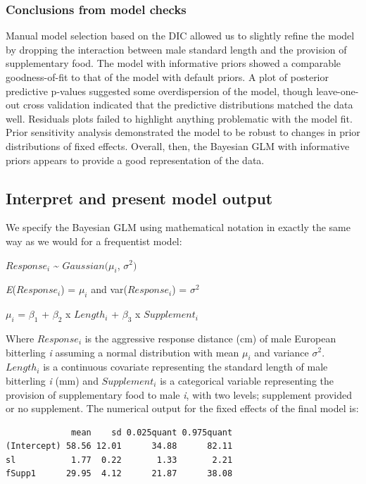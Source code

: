 \documentclass[
]{book}
\begin{document}
\hypertarget{conclusions-from-model-checks}{%
\subsubsection{Conclusions from model checks}\label{conclusions-from-model-checks}}

Manual model selection based on the DIC allowed us to slightly refine the model by dropping the interaction between male standard length and the provision of supplementary food. The model with informative priors showed a comparable goodness-of-fit to that of the model with default priors. A plot of posterior predictive p-values suggested some overdispersion of the model, though leave-one-out cross validation indicated that the predictive distributions matched the data well. Residuals plots failed to highlight anything problematic with the model fit. Prior sensitivity analysis demonstrated the model to be robust to changes in prior distributions of fixed effects. Overall, then, the Bayesian GLM with informative priors appears to provide a good representation of the data.

\hypertarget{interpret-and-present-model-output}{%
\subsection{Interpret and present model output}\label{interpret-and-present-model-output}}

We specify the Bayesian GLM using mathematical notation in exactly the same way as we would for a frequentist model:

\(Response_{i}\) \textasciitilde{} \(Gaussian(\mu_{i}\), \(\sigma^{2})\)

\emph{E}(\(Response_i\)) = \(\mu_i\) and var(\(Response_{i}\)) = \(\sigma^{2}\)

\(\mu_{i}\) = \(\beta_1\) + \(\beta_2\) x \(Length_{i}\) + \(\beta_3\) x \(Supplement_{i}\)

Where \(Response_{i}\) is the aggressive response distance (cm) of male European bitterling \emph{i} assuming a normal distribution with mean \(\mu_{i}\) and variance \(\sigma^{2}\). \(Length_{i}\) is a continuous covariate representing the standard length of male bitterling \emph{i} (mm) and \(Supplement_{i}\) is a categorical variable representing the provision of supplementary food to male \emph{i}, with two levels; supplement provided or no supplement. The numerical output for the fixed effects of the final model is:

\begin{verbatim}
             mean    sd 0.025quant 0.975quant
(Intercept) 58.56 12.01      34.88      82.11
sl           1.77  0.22       1.33       2.21
fSupp1      29.95  4.12      21.87      38.08
\end{verbatim}
\end{document}
